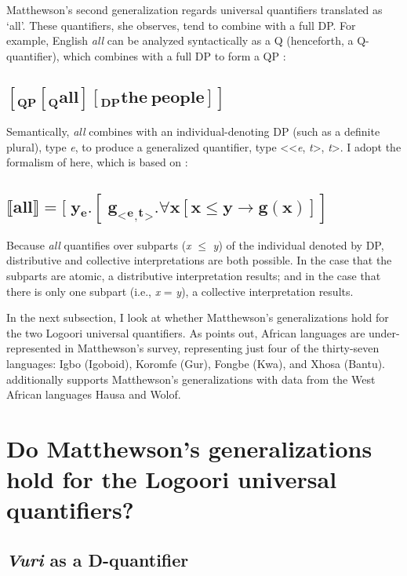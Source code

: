 \documentclass[output=paper]{langsci/langscibook}
\begin{document}
Matthewson's second generalization regards universal quantifiers translated as ‘all’. These quantifiers, she observes, tend to combine with a full DP. For example, English \textit{all} can be analyzed syntactically as a Q (henceforth, a Q-quantifier), which combines with a full DP to form a QP \citep{Matthewson2001}:  

\subsection{$\mathbf{[_{QP} [_{Q} {all}] [_{ DP} {the\ people}]]}$}

Semantically, \textit{all} combines with an individual-denoting DP (such as a definite plural), type \textit{e}, to produce a generalized quantifier, type <<\textit{e},\textit{ t}>, \textit{t}>. I adopt the formalism of \citet{Zimmermann2014} here, which is based on \citet{Matthewson2001}:

\subsection{$\mathbf{⟦{all}⟧ = [{y}{_{e}} . [{g}_{<}{_{e}}_{,} {_{t}}_{>} . {\forall}{x} [ {x} {\leq}{ y} \to {g}({x})]]}$}

Because \textit{all} quantifies over subparts (\textit{x} ${\leq}$ \textit{y}) of the individual denoted by DP, distributive and collective interpretations are both possible. In the case that the subparts are atomic, a distributive interpretation results; and in the case that there is only one subpart (i.e., \textit{x} = \textit{y}), a collective interpretation results.

In the next subsection, I look at whether Matthewson's generalizations hold for the two Logoori universal quantifiers. As \citet{Zimmermann2014} points out, African languages are under-represented in Matthewson's survey, representing just four of the thirty-seven languages: Igbo (Igoboid), Koromfe (Gur), Fongbe (Kwa), and Xhosa (Bantu). \citet{Zimmermann2014} additionally supports Matthewson's generalizations with data from the West African languages Hausa \citep{Zimmermann2013} and Wolof.

\section{Do Matthewson's generalizations hold for the Logoori universal quantifiers?}
\subsection{\textit{Vuri} as a D-quantifier}
\end{document}
